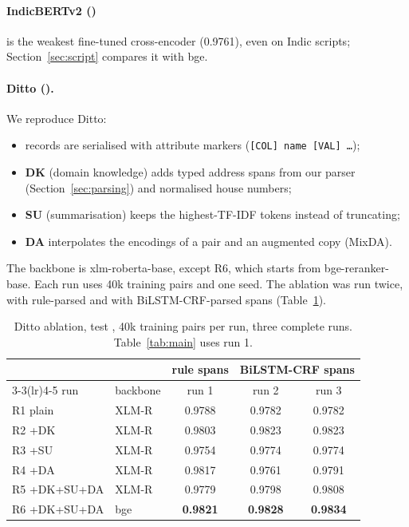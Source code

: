 \paragraph{IndicBERTv2 ()} is the weakest fine-tuned cross-encoder (0.9761), even on Indic scripts;
Section~\ref{sec:script} compares it with bge.

\paragraph{Ditto ().} We reproduce Ditto:
\begin{itemize}
  \item records are serialised with attribute markers (\texttt{[COL] name [VAL] \dots});
  \item \textbf{DK} (domain knowledge) adds typed address spans from our parser (Section~\ref{sec:parsing}) and
        normalised house numbers;
  \item \textbf{SU} (summarisation) keeps the highest-TF-IDF tokens instead of truncating;
  \item \textbf{DA} interpolates the encodings of a pair and an augmented copy (MixDA).
\end{itemize}
The backbone is xlm-roberta-base, except R6, which starts from bge-reranker-base. Each run uses 40k
training pairs and one seed. The ablation was run twice, with rule-parsed and with BiLSTM-CRF-parsed spans
(Table~\ref{tab:ditto}).

\begin{table}[h]
\centering\small
\begin{tabular}{llccc}
\toprule
 & & rule spans & \multicolumn{2}{c}{BiLSTM-CRF spans} \\
\cmidrule(lr){3-3}\cmidrule(lr){4-5}
run & backbone & run 1 & run 2 & run 3 \\
\midrule
R1 plain           & XLM-R & 0.9788 & 0.9782 & 0.9782 \\
R2 +DK             & XLM-R & 0.9803 & 0.9823 & 0.9823 \\
R3 +SU             & XLM-R & 0.9754 & 0.9774 & 0.9774 \\
R4 +DA             & XLM-R & 0.9817 & 0.9761 & 0.9791 \\
R5 +DK+SU+DA       & XLM-R & 0.9779 & 0.9798 & 0.9808 \\
R6 +DK+SU+DA       & bge   & \textbf{0.9821} & \textbf{0.9828} & \textbf{0.9834} \\
\bottomrule
\end{tabular}
\caption{Ditto ablation, test \fhalf{}, 40k training pairs per run, three complete runs.
Table~\ref{tab:main} uses run 1.}
\label{tab:ditto}
\end{table}

